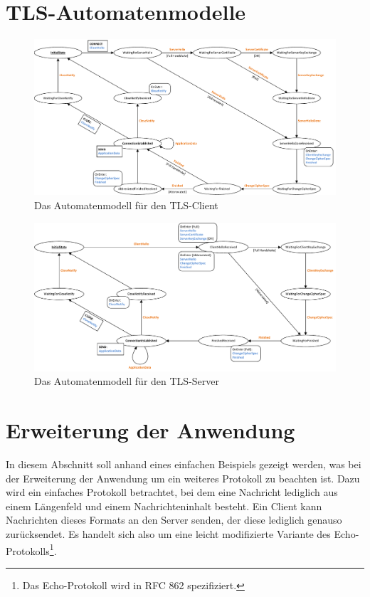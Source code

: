\appendix

\chapter{TLS-Automatenmodelle}
\label{cha_tls_state_machines}

\begin{figure}[H]
	\centering
	\includegraphics[scale=0.75, angle = 90]{Diagrams/statemachines/client_state_machine.pdf} %
	\caption{Das Automatenmodell für den TLS-Client}
	\label{fig_tls_client_state_machine}
\end{figure}

\begin{figure}[H]
	\centering
	\includegraphics[scale=0.75, angle = 90]{Diagrams/statemachines/server_state_machine.pdf} %
	\caption{Das Automatenmodell für den TLS-Server}
	\label{fig_tls_server_state_machine}
\end{figure}


\chapter{Erweiterung der Anwendung}

In diesem Abschnitt soll anhand eines einfachen Beispiels gezeigt werden, was bei der Erweiterung der Anwendung um ein weiteres Protokoll zu beachten ist. Dazu wird ein einfaches Protokoll betrachtet, bei dem eine Nachricht lediglich aus einem Längenfeld und einem Nachrichteninhalt besteht. Ein Client kann Nachrichten dieses Formats an den Server senden, der diese lediglich genauso zurücksendet. Es handelt sich also um eine leicht modifizierte Variante des Echo-Protokolls\footnote{Das Echo-Protokoll wird in RFC 862 spezifiziert.}.

